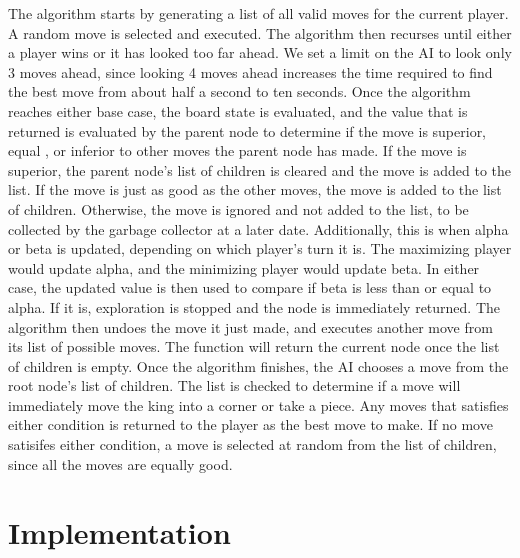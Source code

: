 \documentclass{article}
\begin{document}
	The algorithm starts by generating a list of all valid moves for the current player. A random move is selected and executed. The algorithm then recurses until either a player wins or it has looked too far ahead. We set a limit on the AI to look only 3 moves ahead, since looking 4 moves ahead increases the time required to find the best move from about half a second to ten seconds. Once the algorithm reaches either base case, the board state is evaluated, and the value that is returned is evaluated by the parent node to determine if the move is superior, equal , or inferior to other moves the parent node has made. If the move is superior, the parent node's list of children is cleared and the move is added to the list. If the move is just as good as the other moves, the move is added to the list of children. Otherwise, the move is ignored and not added to the list, to be collected by the garbage collector at a later date. Additionally, this is when alpha or beta is updated, depending on which player's turn it is. The maximizing player would update alpha, and the minimizing player would update beta. In either case, the updated value is then used to compare if beta is less than or equal to alpha. If it is, exploration is stopped and the node is immediately returned. The algorithm then undoes the move it just made, and executes another move from its list of possible moves. The function will return the current node once the list of children is empty. Once the algorithm finishes, the AI chooses a move from the root node's list of children. The list is checked to determine if a move will immediately move the king into a corner or take a piece. Any moves that satisfies either condition is returned to the player as the best move to make. If no move satisifes either condition, a move is selected at random from the list of children, since all the moves are equally good.

\section{Implementation}
\end{document}
